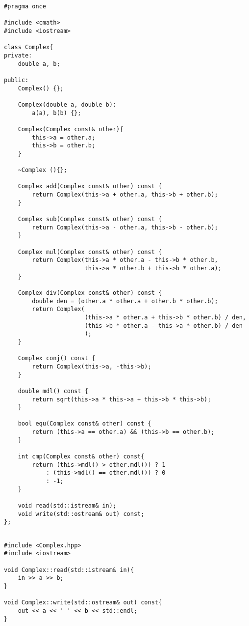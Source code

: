 \documentclass[12pt]{article}
\begin{document}
\begin{lstlisting}[label=some-code,caption={Complex.hpp}]
#pragma once

#include <cmath>
#include <iostream>

class Complex{
private:
    double a, b;

public:
    Complex() {};

    Complex(double a, double b):
        a(a), b(b) {};
    
    Complex(Complex const& other){
        this->a = other.a;
        this->b = other.b;
    }
    
    ~Complex (){};

    Complex add(Complex const& other) const {
        return Complex(this->a + other.a, this->b + other.b);
    }
    
    Complex sub(Complex const& other) const {
        return Complex(this->a - other.a, this->b - other.b);
    }
    
    Complex mul(Complex const& other) const {
        return Complex(this->a * other.a - this->b * other.b,
                       this->a * other.b + this->b * other.a);
    }
    
    Complex div(Complex const& other) const {
        double den = (other.a * other.a + other.b * other.b);            
        return Complex(
                       (this->a * other.a + this->b * other.b) / den,
                       (this->b * other.a - this->a * other.b) / den
                       );
    }

    Complex conj() const {
        return Complex(this->a, -this->b);
    }

    double mdl() const {
        return sqrt(this->a * this->a + this->b * this->b);
    }
    
    bool equ(Complex const& other) const {
        return (this->a == other.a) && (this->b == other.b);
    }

    int cmp(Complex const& other) const{
        return (this->mdl() > other.mdl()) ? 1
            : (this->mdl() == other.mdl()) ? 0
            : -1;
    }

    void read(std::istream& in);
    void write(std::ostream& out) const;
};

\end{lstlisting}
\pagebreak
\begin{lstlisting}[label=some-code,caption={Complex.cpp}]

#include <Complex.hpp>
#include <iostream>

void Complex::read(std::istream& in){
    in >> a >> b;
}

void Complex::write(std::ostream& out) const{
    out << a << ' ' << b << std::endl;
}

\end{lstlisting}
\end{document}
